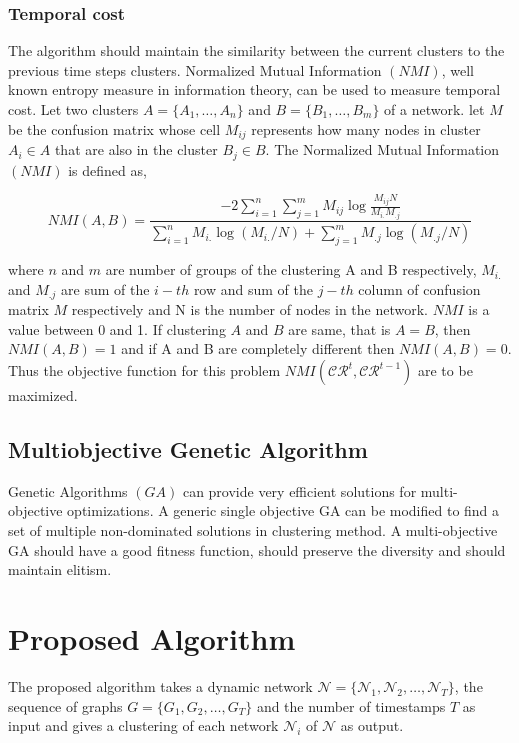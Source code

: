 \documentclass[12pt]{arsubmit}
\begin{document}
\subsubsection{Temporal cost}
The algorithm should maintain the similarity between the current clusters to the previous time steps clusters. Normalized Mutual Information $(NMI)$, well known entropy measure in information theory, can be used to measure temporal cost. Let two clusters  $A = \{A_1,\ldots,A_n\}$ and $B = \{B_1,\ldots,B_m\}$ of a network. let $M$ be the confusion matrix whose cell $M_{ij}$ represents how many nodes in cluster $A_i \in A $ that are also in the cluster $B_j \in B$. The Normalized Mutual Information $(NMI)$ is defined as, 

\begin{equation} NMI(A,B) =\frac{ -2 \sum\limits_{i=1}^n\sum\limits_{j=1}^m M_{ij}\log {\frac {M_{ij}N}{M_{i.}M_{.j}}} }{\sum\limits_{i=1}^nM_{i.}\log{(M_{i.}/N)} + \sum\limits_{j=1}^mM_{.j}\log{(M_{.j}/N)}}\label{eq:four}
\end{equation} 

where $n$ and $m$ are number of groups of the clustering A and B respectively, $M_{i.}$ and $M_{.j}$ are sum of the $i-th$ row and sum of the $j-th$ column of confusion matrix $M$ respectively and N is the number of nodes in the network. $NMI$ is a value between 0 and 1. If clustering $A$ and $B$ are same, that is $A = B$, then $NMI(A,B)=1$ and if A and B are completely different then $NMI(A,B) =0$. Thus the objective function for this problem $NMI(\mathcal{CR}^t,\mathcal{CR}^{t-1})$ are to be maximized.


\subsection{Multiobjective Genetic Algorithm}
Genetic Algorithms $(GA)$ can provide very efficient solutions for multi-objective optimizations. A generic single objective GA can be modified to find a set of multiple non-dominated solutions in clustering method. A multi-objective GA should have a good fitness function, should preserve the diversity and should maintain elitism. 

\section{Proposed Algorithm}
The proposed algorithm takes a dynamic network $\mathcal{N} = \{\mathcal{N}_1, \mathcal{N}_2,\ldots,\mathcal{N}_T\}$, the sequence of graphs $G = \{G_1,G_2,\ldots,G_T\}$ and the number of timestamps $T$ as input and gives a clustering of each network $\mathcal{N}_i$ of $\mathcal{N}$ as output.
\end{document}
